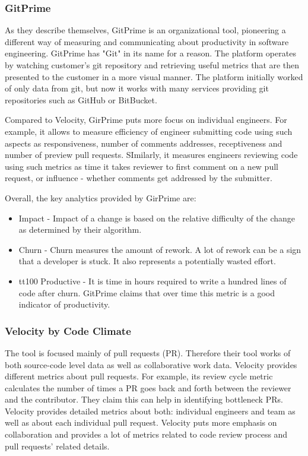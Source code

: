 \documentclass[11pt]{article}
\begin{document}
\subsubsection{GitPrime}
As they describe themselves, GitPrime is an organizational tool, pioneering a different way of measuring and communicating about productivity in software engineering. GitPrime has "Git" in its name for a reason. The platform operates by watching customer's git repository and retrieving useful metrics that are then presented to the customer in a more visual manner. The platform initially worked of only data from git, but now it works with many services providing git repositories such as GitHub or BitBucket. 
\par 
Compared to Velocity, GirPrime puts more focus on individual engineers. For example, it allows to measure efficiency of engineer submitting code using such aspects as responsiveness, number of comments addresses, receptiveness and number of preview pull requests. SImilarly, it measures engineers reviewing code using such metrics as time it takes reviewer to first comment on a new pull request, or influence - whether comments get addressed by the submitter.
\par 
Overall, the key analytics provided by GirPrime are:
\begin{itemize}
	\item Impact - Impact of a change is based on the relative difficulty of the change as determined by their algorithm.
	\item Churn - Churn measures the amount of rework. A lot of rework can be a sign that a developer is stuck. It also represents a potentially wasted effort.
	\item tt100 Productive - It is time in hours required to write a hundred lines of code after churn. GitPrime claims that over time this metric is a good indicator of productivity.
\end{itemize}
\subsubsection{Velocity by Code Climate}
The tool is focused mainly of pull requests (PR). Therefore their tool works of both source-code level data as well as collaborative work data. Velocity provides different metrics about pull requests. For example, its review cycle metric calculates the number of times a PR goes back and forth between the reviewer and the contributor. They claim this can help in identifying bottleneck PRs. Velocity provides detailed metrics about both: individual engineers and team as well as about each individual pull request. Velocity puts more emphasis on collaboration and provides a lot of metrics related to code review process and pull requests' related details.
\end{document}
